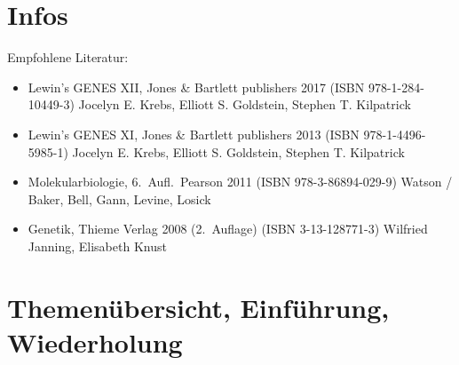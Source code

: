 
\usepackage[ngerman]{babel}










\usepackage{biblatex}


\newcommand\reporttitle{Vorlesung Eukaryotengenetik}
\newcommand\reportsubtitle{Sommersemester 2026}
\newcommand\profs{Vorlesung von Prof. Weisshaar, Universität Bielefeld}
\newcommand\reportsubsubtitle{Vorlesungsnotizen und Aufarbeitung}
\newcommand\reportauthors{
    \textbf{Liliana Sanfilippo}
}



    \frontmatter
    

    \tableofcontents

    \mainmatter
    \chapter*{Infos}
    Empfohlene Literatur:

    \begin{itemize}
        \item Lewin’s GENES XII, Jones \& Bartlett publishers 2017 (ISBN 978-1-284-10449-3)
        Jocelyn E. Krebs, Elliott S. Goldstein, Stephen T. Kilpatrick
        \item Lewin’s GENES XI, Jones \& Bartlett publishers 2013 (ISBN 978-1-4496-5985-1)
        Jocelyn E. Krebs, Elliott S. Goldstein, Stephen T. Kilpatrick
        \item Molekularbiologie, 6.\ Aufl.\ Pearson 2011 (ISBN 978-3-86894-029-9)
        Watson / Baker, Bell, Gann, Levine, Losick
        \item Genetik, Thieme Verlag 2008 (2.\ Auflage) (ISBN 3-13-128771-3)
        Wilfried Janning, Elisabeth Knust
    \end{itemize}

    \chapter{Themenübersicht, Einführung, Wiederholung}
    

